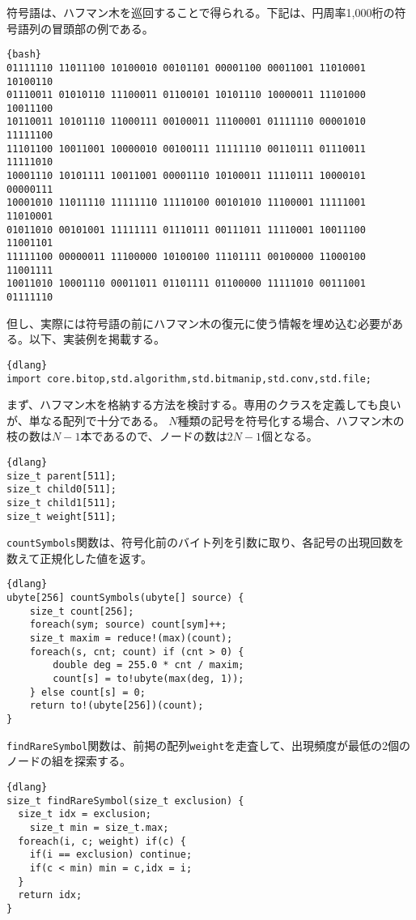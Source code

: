 \documentclass[10pt,a4paper]{book}
\begin{document}
符号語は、ハフマン木を巡回することで得られる。下記は、円周率1,000桁の符号語列の冒頭部の例である。

\begin{Verbatim}{bash}
01111110 11011100 10100010 00101101 00001100 00011001 11010001 10100110
01110011 01010110 11100011 01100101 10101110 10000011 11101000 10011100
10110011 10101110 11000111 00100011 11100001 01111110 00001010 11111100
11101100 10011001 10000010 00100111 11111110 00110111 01110011 11111010
10001110 10101111 10011001 00001110 10100011 11110111 10000101 00000111
10001010 11011110 11111110 11110100 00101010 11100001 11111001 11010001
01011010 00101001 11111111 01110111 00111011 11110001 10011100 11001101
11111100 00000011 11100000 10100100 11101111 00100000 11000100 11001111
10011010 10001110 00011011 01101111 01100000 11111010 00111001 01111110
\end{Verbatim}

但し、実際には符号語の前にハフマン木の復元に使う情報を埋め込む必要がある。以下、実装例を掲載する。

\begin{Verbatim}{dlang}
import core.bitop,std.algorithm,std.bitmanip,std.conv,std.file;
\end{Verbatim}

まず、ハフマン木を格納する方法を検討する。専用のクラスを定義しても良いが、単なる配列で十分である。
$N$種類の記号を符号化する場合、ハフマン木の枝の数は$N\!-\!1$本であるので、ノードの数は$2N\!-\!1$個となる。

\begin{Verbatim}{dlang}
size_t parent[511];
size_t child0[511];
size_t child1[511];
size_t weight[511];
\end{Verbatim}

\texttt{countSymbols}関数は、符号化前のバイト列を引数に取り、各記号の出現回数を数えて正規化した値を返す。

\begin{Verbatim}{dlang}
ubyte[256] countSymbols(ubyte[] source) {
	size_t count[256];
	foreach(sym; source) count[sym]++;
	size_t maxim = reduce!(max)(count);
	foreach(s, cnt; count) if (cnt > 0) {
		double deg = 255.0 * cnt / maxim;
		count[s] = to!ubyte(max(deg, 1));
	} else count[s] = 0;
	return to!(ubyte[256])(count);
}
\end{Verbatim}

\texttt{findRareSymbol}関数は、前掲の配列\texttt{weight}を走査して、出現頻度が最低の2個のノードの組を探索する。

\begin{Verbatim}{dlang}
size_t findRareSymbol(size_t exclusion) {
  size_t idx = exclusion;
	size_t min = size_t.max;
  foreach(i, c; weight) if(c) {
    if(i == exclusion) continue;
    if(c < min) min = c,idx = i;
  }
  return idx;
}
\end{Verbatim}
\end{document}

